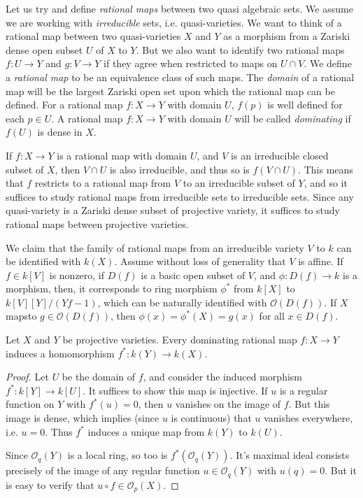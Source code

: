 Let us try and define \emph{rational maps} between two quasi algebraic sets. We assume we are working with \emph{irreducible} sets, i.e. quasi-varieties. We want to think of a rational map between two quasi-varieties $X$ and $Y$ as a morphism from a Zariski dense open subset $U$ of $X$ to $Y$. But we also want to identify two rational maps $f: U \to Y$ and $g: V \to Y$ if they agree when restricted to maps on $U \cap V$. We define a \emph{rational map} to be an equivalence class of such maps. The \emph{domain} of a rational map will be the largest Zariski open set upon which the rational map can be defined. For a rational map $f: X \to Y$ with domain $U$, $f(p)$ is well defined for each $p \in U$. A rational map $f: X \to Y$ with domain $U$ will be called \emph{dominating} if $f(U)$ is dense in $X$.

If $f: X \to Y$ is a rational map with domain $U$, and $V$ is an irreducible closed subset of $X$, then $V \cap U$ is also irreducible, and thus so is $f(V \cap U)$. This means that $f$ restricts to a rational map from $V$ to an irreducible subset of $Y$, and so it suffices to study rational maps from irreducible sets to irreducible sets. Since any quasi-variety is a Zariski dense subset of projective variety, it suffices to study rational maps between projective varieties.

\begin{example}
    We claim that the family of rational maps from an irreducible variety $V$ to $k$ can be identified with $k(X)$. Assume without loss of generality that $V$ is affine. If $f \in k[V]$ is nonzero, if $D(f)$ is a basic open subset of $V$, and $\phi: D(f) \to k$ is a morphism, then, it corresponds to ring morphism $\phi^*$ from $k[X]$ to $k[V][Y]/(Yf - 1)$, which can be naturally identified with $\mathcal{O}(D(f))$. If $X$ mapsto $g \in \mathcal{O}(D(f))$, then $\phi(x) = \phi^*(X) = g(x)$ for all $x \in D(f)$.
\end{example}

\begin{lemma}
    Let $X$ and $Y$ be projective varieties. Every dominating rational map $f: X \to Y$ induces a homomorphism $f^*: k(Y) \to k(X)$.
\end{lemma}
\begin{proof}
    Let $U$ be the domain of $f$, and consider the induced morphism $f^*: k[Y] \to k[U]$. It suffices to show this map is injective. If $u$ is a regular function on $Y$ with $f^*(u) = 0$, then $u$ vanishes on the image of $f$. But this image is dense, which implies (since $u$ is continuous) that $u$ vanishes everywhere, i.e. $u = 0$. Thus $f^*$ induces a unique map from $k(Y)$ to $k(U)$.

    Since $\mathcal{O}_q(Y)$ is a local ring, so too is $f^*(\mathcal{O}_q(Y))$. It's maximal ideal consists precisely of the image of any regular function $u \in \mathcal{O}_q(Y)$ with $u(q) = 0$. But it is easy to verify that $u \circ f \in \mathcal{O}_p(X)$.
\end{proof}

